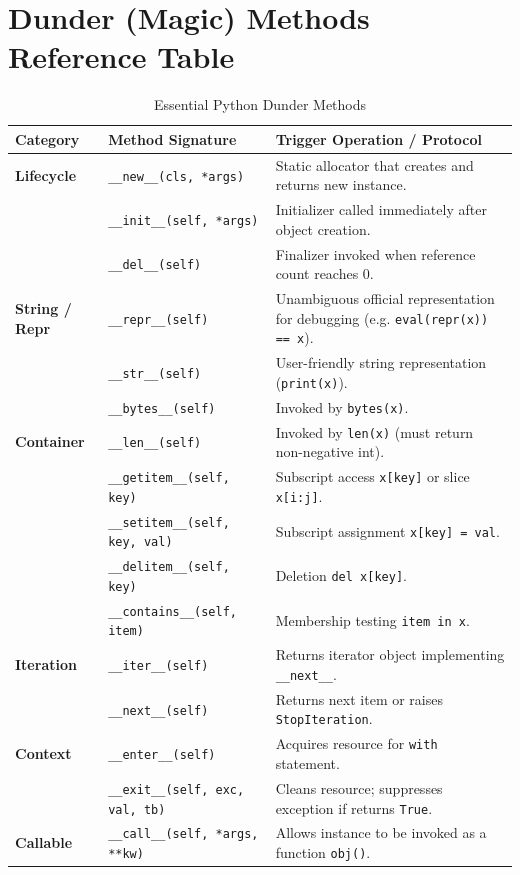 \section{Dunder (Magic) Methods Reference Table}
\begin{table}[htbp]
\centering
\small
\begin{tabularx}{\linewidth}{llX}
\toprule
\textbf{Category} & \textbf{Method Signature} & \textbf{Trigger Operation / Protocol} \\
\midrule
\textbf{Lifecycle} & \texttt{\_\_new\_\_(cls, *args)} & Static allocator that creates and returns new instance. \\
                   & \texttt{\_\_init\_\_(self, *args)} & Initializer called immediately after object creation. \\
                   & \texttt{\_\_del\_\_(self)} & Finalizer invoked when reference count reaches 0. \\
\midrule
\textbf{String / Repr} & \texttt{\_\_repr\_\_(self)} & Unambiguous official representation for debugging (e.g. \texttt{eval(repr(x)) == x}). \\
                      & \texttt{\_\_str\_\_(self)} & User-friendly string representation (\texttt{print(x)}). \\
                      & \texttt{\_\_bytes\_\_(self)} & Invoked by \texttt{bytes(x)}. \\
\midrule
\textbf{Container} & \texttt{\_\_len\_\_(self)} & Invoked by \texttt{len(x)} (must return non-negative int). \\
                   & \texttt{\_\_getitem\_\_(self, key)} & Subscript access \texttt{x[key]} or slice \texttt{x[i:j]}. \\
                   & \texttt{\_\_setitem\_\_(self, key, val)} & Subscript assignment \texttt{x[key] = val}. \\
                   & \texttt{\_\_delitem\_\_(self, key)} & Deletion \texttt{del x[key]}. \\
                   & \texttt{\_\_contains\_\_(self, item)} & Membership testing \texttt{item in x}. \\
\midrule
\textbf{Iteration} & \texttt{\_\_iter\_\_(self)} & Returns iterator object implementing \texttt{\_\_next\_\_}. \\
                   & \texttt{\_\_next\_\_(self)} & Returns next item or raises \texttt{StopIteration}. \\
\midrule
\textbf{Context}   & \texttt{\_\_enter\_\_(self)} & Acquires resource for \texttt{with} statement. \\
                   & \texttt{\_\_exit\_\_(self, exc, val, tb)} & Cleans resource; suppresses exception if returns \texttt{True}. \\
\midrule
\textbf{Callable}  & \texttt{\_\_call\_\_(self, *args, **kw)} & Allows instance to be invoked as a function \texttt{obj()}. \\
\bottomrule
\end{tabularx}
\caption{Essential Python Dunder Methods}
\end{table}

